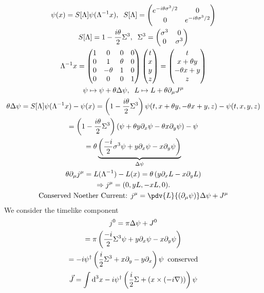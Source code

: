 \documentclass[]{scrartcl}
\begin{document}
\begin{gather}
	\psi(x) = S[\Lambda]\psi(\Lambda^{-1}x), \;\; S[\Lambda] =
	\begin{pmatrix}
		e^{-i\theta\sigma^3/2} & 0\\
		0 & e^{-i\theta\sigma^3/2}
	\end{pmatrix}\\
	S[\Lambda] = 1 - \frac{i\theta}{2}\Sigma^3,\;\; \Sigma^3 = 
	\begin{pmatrix}
		\sigma^3 & 0 \\ 0 & \sigma^3
	\end{pmatrix}\\
	\Lambda^{-1}x =
	\begin{pmatrix}
		1 & 0 & 0 & 0\\
		0 & 1 & \theta & 0\\
		0 & -\theta & 1 & 0\\
		0 & 0 & 0 & 1
	\end{pmatrix}
	\begin{pmatrix}
		t \\ x \\ y \\ z
	\end{pmatrix} = 
	\begin{pmatrix}
		t \\ x+\theta y\\ -\theta x + y\\ z
	\end{pmatrix}\\
	\psi \mapsto \psi + \theta\Delta\psi,\;\; L \mapsto L + \theta\partial_\mu J^\mu\\
	\theta\Delta\psi = S[\Lambda]\psi(\Lambda^{-1}x) - \psi(x) = \left(1 - \frac{i\theta}{2}\Sigma^3\right)\psi(t, x+\theta y, -\theta x + y, z) - \psi(t,x,y,z)\\
	= \left(1 - \frac{i\theta}{2}\Sigma^3\right)(\psi + \theta y\partial_x \psi - \theta x \partial_y \psi) - \psi\\
	= \theta\underbrace{\left(\frac{-i}{2}\sigma^3 \psi + y\partial_x\psi - x\partial_y\psi\right)}_{\Delta\psi}\\
	\theta\partial_\mu j^\mu = L(\Lambda^{-1}) - L(x) = \theta\left(y\partial_x L - x \partial_y L\right) \\
	\Rightarrow j^\mu = (0, yL , -xL, 0).\\
\text{Conserved Noether Current: } j^\mu = \pdv{L}{(\partial_\mu\psi)} \Delta\psi + J^\mu
\end{gather}
We consider the timelike component
\begin{gather}
	j^0 = \pi\Delta\psi + J^0\\
	= \pi\left(\frac{-i}{2}\Sigma^3\psi + y\partial_x \psi - x\partial_y\psi\right)\\
	= -i\psi^\dagger\left(\frac{i}{2}\Sigma^3 + x\partial_y - y\partial_x\right)\psi\;\;\text{conserved}\\
	\vec J = \int\text d^3x -i\psi^\dagger\left(\frac{i}{2}\Sigma + (x \times (-i\nabla))\right)\psi
\end{gather}
\end{document}
